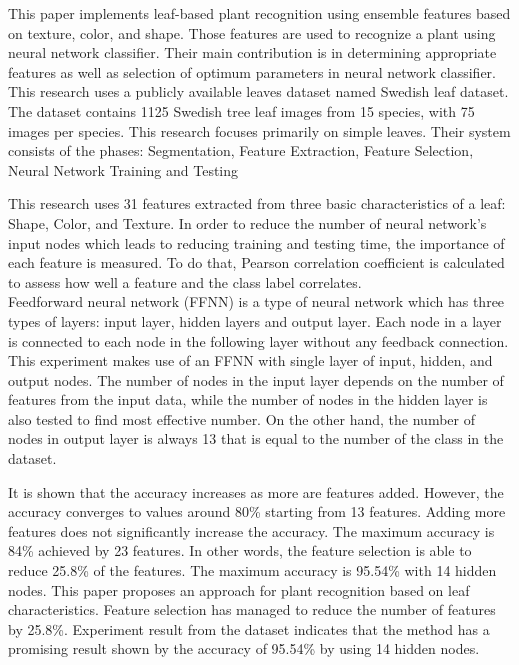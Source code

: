 This paper implements leaf-based plant recognition using
ensemble features based on texture, color, and shape. Those
features are used to recognize a plant using neural network
classifier. Their main contribution is in determining
appropriate features as well as selection of optimum parameters
in neural network classifier. This research uses a publicly available leaves dataset
named Swedish leaf dataset. The dataset contains 1125
Swedish tree leaf images from 15 species, with 75 images
per species. This research focuses primarily on simple leaves.
Their system consists of the phases: Segmentation, Feature Extraction, Feature Selection, Neural Network Training and Testing

This research uses 31 features extracted from three basic
characteristics of a leaf: Shape, Color, and Texture. In order to reduce the number of neural network’s input nodes
which leads to reducing training and testing time, the
importance of each feature is measured. To do that, Pearson
correlation coefficient is calculated to assess how well a
feature and the class label correlates.\\

Feedforward neural network (FFNN) is a type of neural network which
has three types of layers: input layer, hidden layers and output
layer. Each node in a layer is connected to each node in the
following layer without any feedback connection.
This experiment makes use of an FFNN with single layer
of input, hidden, and output nodes. The number of nodes in
the input layer depends on the number of features from the
input data, while the number of nodes in the hidden layer
is also tested to find most effective number. On
the other hand, the number of nodes in output layer is always
13 that is equal to the number of the class in the dataset. 

It is shown that the accuracy increases as more are
features added. However, the accuracy converges to values
around 80\% starting from 13 features. Adding more
features does not significantly increase the accuracy. The
maximum accuracy is 84\% achieved by 23 features. In other
words, the feature selection is able to reduce 25.8\% of the
features. The maximum accuracy is 95.54\%
with 14 hidden nodes. This paper proposes an approach for plant
recognition based on leaf characteristics. Feature selection has
managed to reduce the number of features by 25.8\%.
Experiment result from the dataset indicates that the method
has a promising result shown by the accuracy of 95.54\% by
using 14 hidden nodes.


